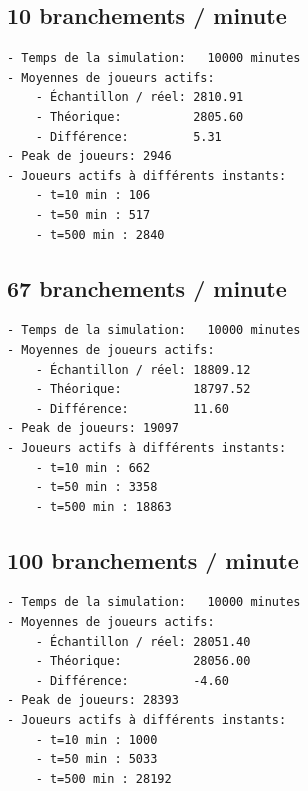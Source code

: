     \subsection{10 branchements / minute}\label{branchements-minute}

\begin{verbatim}
- Temps de la simulation:   10000 minutes
- Moyennes de joueurs actifs:
    - Échantillon / réel: 2810.91
    - Théorique:          2805.60
    - Différence:         5.31
- Peak de joueurs: 2946
- Joueurs actifs à différents instants:
    - t=10 min : 106
    - t=50 min : 517
    - t=500 min : 2840
\end{verbatim}

\subsection{67 branchements / minute}\label{branchements-minute-1}

\begin{verbatim}
- Temps de la simulation:   10000 minutes
- Moyennes de joueurs actifs:
    - Échantillon / réel: 18809.12
    - Théorique:          18797.52
    - Différence:         11.60
- Peak de joueurs: 19097
- Joueurs actifs à différents instants:
    - t=10 min : 662
    - t=50 min : 3358
    - t=500 min : 18863
\end{verbatim}

\subsection{100 branchements / minute}\label{branchements-minute-2}

\begin{verbatim}
- Temps de la simulation:   10000 minutes
- Moyennes de joueurs actifs:
    - Échantillon / réel: 28051.40
    - Théorique:          28056.00
    - Différence:         -4.60
- Peak de joueurs: 28393
- Joueurs actifs à différents instants:
    - t=10 min : 1000
    - t=50 min : 5033
    - t=500 min : 28192
\end{verbatim}



